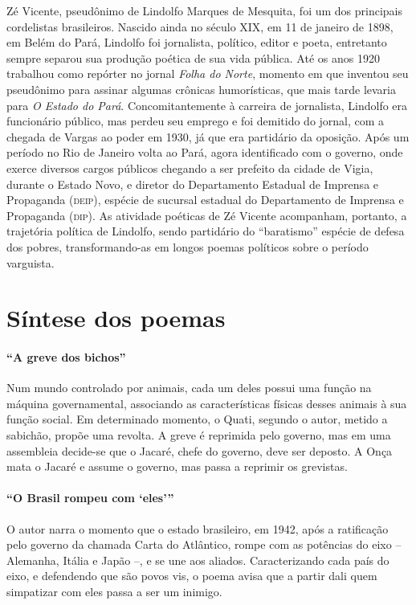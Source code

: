 Zé Vicente, pseudônimo de Lindolfo Marques de Mesquita, foi um dos
principais cordelistas brasileiros. Nascido ainda no século XIX, em 11 de
janeiro de 1898, em Belém do Pará, Lindolfo foi jornalista, político,
editor e poeta, entretanto sempre separou sua produção poética de sua
vida pública. Até os anos 1920 trabalhou como repórter no jornal \textit{Folha
do Norte}, momento em que inventou seu pseudônimo para assinar algumas
crônicas humorísticas, que mais tarde levaria para \textit{O Estado do Pará}.
Concomitantemente à carreira de jornalista, Lindolfo era funcionário
público, mas perdeu seu emprego e foi demitido do jornal, com a chegada
de Vargas ao poder em 1930, já que era partidário da oposição. Após um
período no Rio de Janeiro volta ao Pará, agora identificado com o
governo, onde exerce diversos cargos públicos chegando a ser prefeito
da cidade de Vigia, durante o Estado Novo, e diretor do Departamento
Estadual de Imprensa e Propaganda (\textsc{deip}), espécie de sucursal estadual
do Departamento de Imprensa e Propaganda (\textsc{dip}). 
As atividade poéticas de Zé Vicente acompanham, portanto, a
trajetória política de Lindolfo, sendo partidário do
``baratismo'' espécie de defesa dos pobres, transformando-as 
em longos poemas políticos sobre o período varguista.


\section{Síntese dos poemas}

\medskip

\paragraph{``A greve dos bichos''}

Num mundo controlado por animais, cada um deles possui uma função na
máquina governamental, associando as características físicas desses
animais à sua função social. Em determinado momento, o Quati, segundo
o autor, metido a sabichão, propõe uma revolta. A greve é reprimida
pelo governo, mas em uma assembleia decide-se que o Jacaré,
chefe do governo, deve ser deposto. A Onça mata o Jacaré e assume o
governo, mas passa a reprimir os grevistas. 


\paragraph{``O Brasil rompeu com `eles'''}

O autor narra o momento que o estado brasileiro, em 1942, 
após a ratificação pelo governo da chamada Carta do Atlântico, 
rompe com as potências do eixo -- Alemanha, Itália e Japão --, e se une
aos aliados. Caracterizando cada país do eixo, e defendendo que são
povos vis, o poema avisa que a partir dali quem simpatizar com eles
passa a ser um inimigo.

